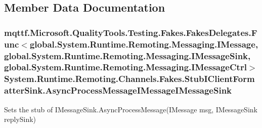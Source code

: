 \subsection{Member Data Documentation}
\hypertarget{class_system_1_1_runtime_1_1_remoting_1_1_channels_1_1_fakes_1_1_stub_i_client_formatter_sink_a2b6127dacce8501f6bfc71ba7248d0bf}{
\subsubsection[{Async\-Process\-Message\-I\-Message\-I\-Message\-Sink}]{\setlength{\rightskip}{0pt plus 5cm}mqttf.\-Microsoft.\-Quality\-Tools.\-Testing.\-Fakes.\-Fakes\-Delegates.\-Func$<$global.\-System.\-Runtime.\-Remoting.\-Messaging.\-I\-Message, global.\-System.\-Runtime.\-Remoting.\-Messaging.\-I\-Message\-Sink, global.\-System.\-Runtime.\-Remoting.\-Messaging.\-I\-Message\-Ctrl$>$ System.\-Runtime.\-Remoting.\-Channels.\-Fakes.\-Stub\-I\-Client\-Formatter\-Sink.\-Async\-Process\-Message\-I\-Message\-I\-Message\-Sink}}\label{class_system_1_1_runtime_1_1_remoting_1_1_channels_1_1_fakes_1_1_stub_i_client_formatter_sink_a2b6127dacce8501f6bfc71ba7248d0bf}


Sets the stub of I\-Message\-Sink.\-Async\-Process\-Message(\-I\-Message msg, I\-Message\-Sink reply\-Sink)

